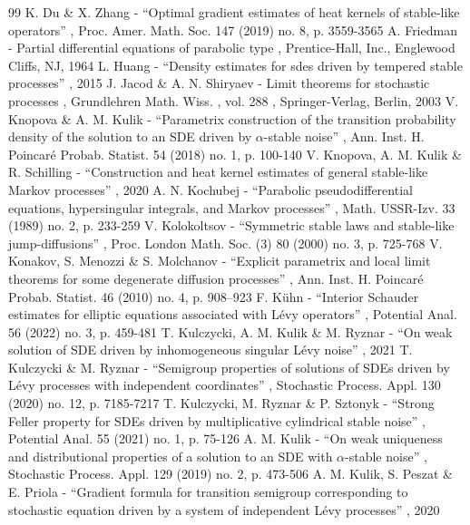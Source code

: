 \documentclass[11pt]{article}
\numberwithin{equation}{section}\providecommand{\asymp}{\mathrel{\sim}}
\theoremstyle{plain}
\theoremstyle{definition}
\newcommand\1{{\mathbf{1}}}
\begin{document}
\begin{thebibliography}{99}
 K. Du \& X. Zhang - “Optimal gradient estimates of heat kernels of stable-like operators” , Proc. Amer. Math. Soc. 147 (2019) no. 8, p. 3559-3565
 A. Friedman - Partial differential equations of parabolic type , Prentice-Hall, Inc., Englewood Cliffs, NJ, 1964
 L. Huang - “Density estimates for sdes driven by tempered stable processes” , 2015
 J. Jacod \& A. N. Shiryaev - Limit theorems for stochastic processes , Grundlehren Math. Wiss. , vol. 288 , Springer-Verlag, Berlin, 2003
 V. Knopova \& A. M. Kulik - “Parametrix construction of the transition probability density of the solution to an SDE driven by $\alpha $-stable noise” , Ann. Inst. H. Poincaré Probab. Statist. 54 (2018) no. 1, p. 100-140
 V. Knopova, A. M. Kulik \& R. Schilling - “Construction and heat kernel estimates of general stable-like Markov processes” , 2020
 A. N. Kochubej - “Parabolic pseudodifferential equations, hypersingular integrals, and Markov processes” , Math. USSR-Izv. 33 (1989) no. 2, p. 233-259
 V. Kolokoltsov - “Symmetric stable laws and stable-like jump-diffusions” , Proc. London Math. Soc. (3) 80 (2000) no. 3, p. 725-768
 V. Konakov, S. Menozzi \& S. Molchanov - “Explicit parametrix and local limit theorems for some degenerate diffusion processes” , Ann. Inst. H. Poincaré Probab. Statist. 46 (2010) no. 4, p. 908--923
 F. Kühn - “Interior Schauder estimates for elliptic equations associated with Lévy operators” , Potential Anal. 56 (2022) no. 3, p. 459-481
 T. Kulczycki, A. M. Kulik \& M. Ryznar - “On weak solution of SDE driven by inhomogeneous singular Lévy noise” , 2021
 T. Kulczycki \& M. Ryznar - “Semigroup properties of solutions of SDEs driven by Lévy processes with independent coordinates” , Stochastic Process. Appl. 130 (2020) no. 12, p. 7185-7217
 T. Kulczycki, M. Ryznar \& P. Sztonyk - “Strong Feller property for SDEs driven by multiplicative cylindrical stable noise” , Potential Anal. 55 (2021) no. 1, p. 75-126
 A. M. Kulik - “On weak uniqueness and distributional properties of a solution to an SDE with $\alpha $-stable noise” , Stochastic Process. Appl. 129 (2019) no. 2, p. 473-506
 A. M. Kulik, S. Peszat \& E. Priola - “Gradient formula for transition semigroup corresponding to stochastic equation driven by a system of independent Lévy processes” , 2020

\end{thebibliography}
\end{document}
